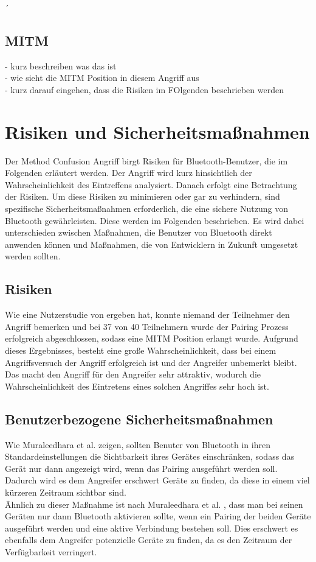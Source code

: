 ´\documentclass[
    a4paper,
    pagesize,
    pdftex,
    12pt,
]{scrartcl}
\begin{document}
    \subsection{MITM}
    - kurz beschreiben was das ist \\
    - wie sieht die MITM Position in diesem Angriff aus \\
    - kurz darauf eingehen, dass die Risiken im FOlgenden beschrieben werden

    \newpage
    \section{Risiken und Sicherheitsmaßnahmen}
   Der Method Confusion Angriff birgt Risiken für Bluetooth-Benutzer, die im Folgenden erläutert werden. Der Angriff wird kurz hinsichtlich der Wahrscheinlichkeit des Eintreffens analysiert. Danach erfolgt eine Betrachtung der Risiken. Um diese Risiken zu minimieren oder gar zu verhindern, sind spezifische Sicherheitsmaßnahmen erforderlich, die eine sichere Nutzung von Bluetooth gewährleisten. Diese werden im Folgenden beschrieben. Es wird dabei unterschieden zwischen Maßnahmen, die Benutzer von Bluetooth direkt anwenden können und Maßnahmen, die von Entwicklern in Zukunft umgesetzt werden sollten.

   \subsection{Risiken}
   Wie eine Nutzerstudie von \cite{method_confusion_attack} ergeben hat, konnte niemand der Teilnehmer den Angriff bemerken und bei 37 von 40 Teilnehmern wurde der Pairing Prozess erfolgreich abgeschlossen, sodass eine MITM Position erlangt wurde. Aufgrund dieses Ergebnisses, besteht eine große Wahrscheinlichkeit, dass bei einem Angriffsversuch der Angriff erfolgreich ist und der Angreifer unbemerkt bleibt. Das macht den Angriff für den Angreifer sehr attraktiv, wodurch die Wahrscheinlichkeit des Eintretens eines solchen Angriffes sehr hoch ist. \\
   
\subsection{Benutzerbezogene Sicherheitsmaßnahmen}
    Wie Muraleedhara et al. \cite{bluetooth_newest_security_risks} zeigen, sollten Benuter von Bluetooth in ihren Standardeinstellungen die Sichtbarkeit ihres Gerätes einschränken, sodass das Gerät nur dann angezeigt wird, wenn das Pairing ausgeführt werden soll. Dadurch wird es dem Angreifer erschwert Geräte zu finden, da diese in einem viel kürzeren Zeitraum sichtbar sind. \\
    Ähnlich zu dieser Maßnahme ist nach Muraleedhara et al. \cite{bluetooth_newest_security_risks}, dass man bei seinen Geräten nur dann Bluetooth aktivieren sollte, wenn ein Pairing der beiden Geräte ausgeführt werden und eine aktive Verbindung bestehen soll. Dies erschwert es ebenfalls dem Angreifer potenzielle Geräte zu finden, da es den Zeitraum der Verfügbarkeit verringert.
\end{document}

